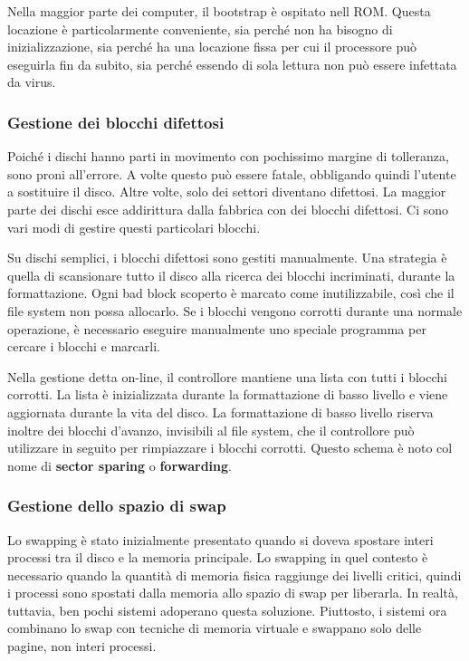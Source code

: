 \documentclass[a4paper]{article}
\begin{document}
Nella maggior parte dei computer, il bootstrap è ospitato nell ROM. Questa locazione è particolarmente conveniente, sia perché non ha bisogno di inizializzazione, sia perché ha una locazione fissa per cui il processore può eseguirla fin da subito, sia perché essendo di sola lettura non può essere infettata da virus.

\subsubsection{Gestione dei blocchi difettosi}
Poiché i dischi hanno parti in movimento con pochissimo margine di tolleranza, sono proni all'errore. A volte questo può essere fatale, obbligando quindi l'utente a sostituire il disco. Altre volte, solo dei settori diventano difettosi. La maggior parte dei dischi esce addirittura dalla fabbrica con dei blocchi difettosi. Ci sono vari modi di gestire questi particolari blocchi.

Su dischi semplici, i blocchi difettosi sono gestiti manualmente. Una strategia è quella di scansionare tutto il disco alla ricerca dei blocchi incriminati, durante la formattazione. Ogni bad block scoperto è marcato come inutilizzabile, così che il file system non possa allocarlo. Se i blocchi vengono corrotti durante una normale operazione, è necessario eseguire manualmente uno speciale programma per cercare i blocchi e marcarli.

Nella gestione detta on-line, il controllore mantiene una lista con tutti i blocchi corrotti. La lista è inizializzata durante la formattazione di basso livello e viene aggiornata durante la vita del disco. La formattazione di basso livello riserva inoltre dei blocchi d'avanzo, invisibili al file system, che il controllore può utilizzare in seguito per rimpiazzare i blocchi corrotti. Questo schema è noto col nome di \textbf{sector sparing} o \textbf{forwarding}.

\subsubsection{Gestione dello spazio di swap}
Lo swapping è stato inizialmente presentato quando si doveva spostare interi processi tra il disco e la memoria principale. Lo swapping in quel contesto è necessario quando la quantità di memoria fisica raggiunge dei livelli critici, quindi i processi sono spostati dalla memoria allo spazio di swap per liberarla. In realtà, tuttavia, ben pochi sistemi adoperano questa soluzione. Piuttosto, i sistemi ora combinano lo swap con tecniche di memoria virtuale e swappano solo delle pagine, non interi processi.
\end{document}
